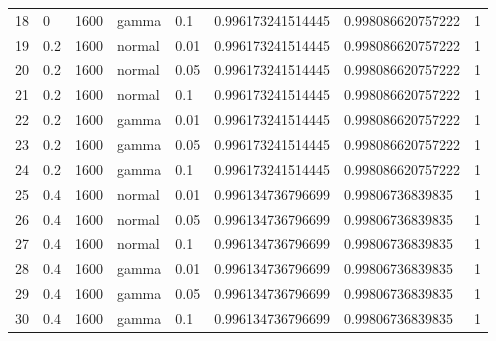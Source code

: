 \begin{table}[ht]
\begin{tabular}{rlllllll}
  18 & 0 & 1600 & gamma & 0.1 & 0.996173241514445 & 0.998086620757222 & 1 \\ 
  19 & 0.2 & 1600 & normal & 0.01 & 0.996173241514445 & 0.998086620757222 & 1 \\ 
  20 & 0.2 & 1600 & normal & 0.05 & 0.996173241514445 & 0.998086620757222 & 1 \\ 
  21 & 0.2 & 1600 & normal & 0.1 & 0.996173241514445 & 0.998086620757222 & 1 \\ 
  22 & 0.2 & 1600 & gamma & 0.01 & 0.996173241514445 & 0.998086620757222 & 1 \\ 
  23 & 0.2 & 1600 & gamma & 0.05 & 0.996173241514445 & 0.998086620757222 & 1 \\ 
  24 & 0.2 & 1600 & gamma & 0.1 & 0.996173241514445 & 0.998086620757222 & 1 \\ 
  25 & 0.4 & 1600 & normal & 0.01 & 0.996134736796699 & 0.99806736839835 & 1 \\ 
  26 & 0.4 & 1600 & normal & 0.05 & 0.996134736796699 & 0.99806736839835 & 1 \\ 
  27 & 0.4 & 1600 & normal & 0.1 & 0.996134736796699 & 0.99806736839835 & 1 \\ 
  28 & 0.4 & 1600 & gamma & 0.01 & 0.996134736796699 & 0.99806736839835 & 1 \\ 
  29 & 0.4 & 1600 & gamma & 0.05 & 0.996134736796699 & 0.99806736839835 & 1 \\ 
  30 & 0.4 & 1600 & gamma & 0.1 & 0.996134736796699 & 0.99806736839835 & 1 \\ 
   \hline
\end{tabular}
\end{table}


